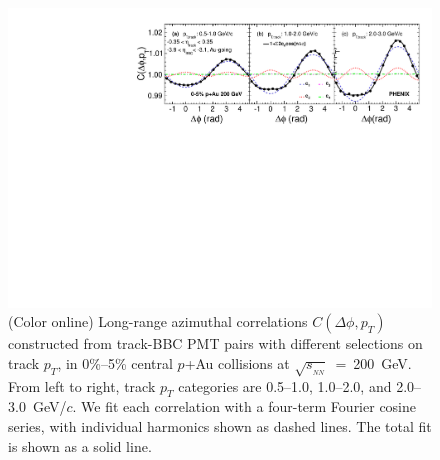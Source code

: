 \documentclass[%
reprint,
showpacs,preprintnumbers,
 amsmath,amssymb,
 aps,
]{revtex4-1}
\newcommand{\pt}{\mbox{$p_T$}\xspace}
\newcommand{\sqsn}{\mbox{$\sqrt{s_{_{NN}}}$}\xspace}
\newcommand{\dau}{\mbox{$d$+Au}\xspace}
\newcommand{\pau}{\mbox{$p$+Au}\xspace}
\newcommand{\hau}{\mbox{$^3\text{He}$+Au}\xspace}
\begin{document}
\begin{figure}[htbp]
  \includegraphics[scale=0.8]{Figures/figure1.pdf}
  \caption{(Color online) Long-range azimuthal correlations $C(\Delta\phi,p_{T})$ constructed from track-BBC PMT pairs with different selections on
track \pt, in 0\%--5\% central \pau collisions at \sqsn~=~200~GeV. From left to right,
track \pt categories are 0.5--1.0, 1.0--2.0, and 2.0--3.0~GeV/$c$. We fit each correlation with a four-term Fourier cosine series, with individual harmonics shown as dashed lines. The total fit is shown as a solid line.}
\label{fig:figure1}
\end{figure}


\end{document}
